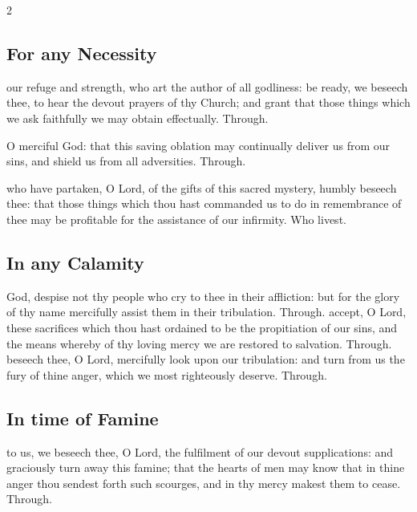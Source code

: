 \begin{multicols}{2}
\subsection{For any Necessity}
\collect
{} our refuge and strength, who art the author of all godliness: be ready, we beseech thee, to hear the devout prayers of thy Church; and grant that those things which we ask faithfully we may obtain effectually. Through.

\secret
{} O merciful God: that this saving oblation may continually deliver us from our sins, and shield us from all adversities. Through.

\newcolumn

\postcommunion
{} who have partaken, O Lord, of the gifts of this sacred mystery, humbly beseech thee: that those things which thou hast commanded us to do in remembrance of thee may be profitable for the assistance of our infirmity. Who livest.

\subsection{In any Calamity}
\collect
{} God, despise not thy people who cry to thee in their affliction: but for the glory of thy name mercifully assist them in their tribulation. Through.
\secret
{} accept, O Lord, these sacrifices which thou hast ordained to be the propitiation of our sins, and the means whereby of thy loving mercy we are restored to salvation. Through.
\postcommunion
{} beseech thee, O Lord, mercifully look upon our tribulation: and turn from us the fury of thine anger, which we most righteously deserve. Through.

\newcolumn

\subsection{In time of Famine}

\vspace{-0.25\baselineskip}

\collect

\vspace{-0.1\baselineskip}

 to us, we beseech thee, O Lord, the fulfilment of our devout supplications: and graciously turn away this famine; that the hearts of men may know that in thine anger thou sendest forth such scourges, and in thy mercy makest them to cease. Through.


\end{multicols}
